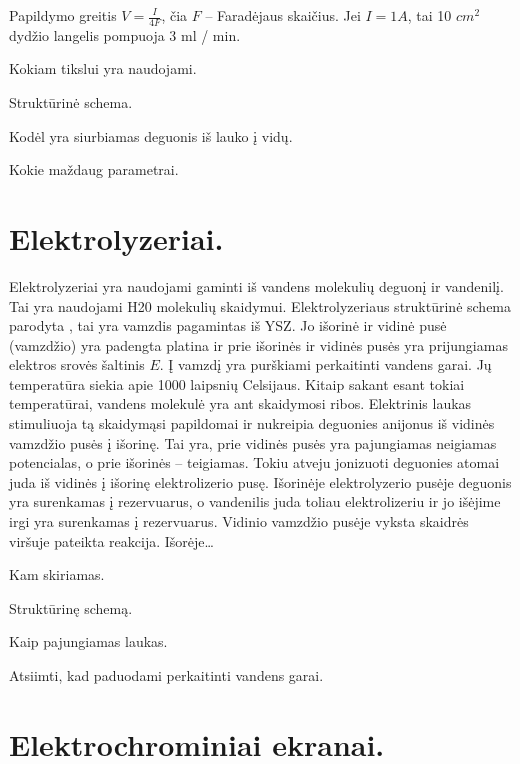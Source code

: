 Papildymo greitis $V = \frac{I}{4F}$, čia $F$ – Faradėjaus skaičius.
Jei $I = 1A$, tai 10 $cm^{2}$  dydžio langelis pompuoja 3 ml / min.
\begin{remember}
  \item Kokiam tikslui yra naudojami.
  \item Struktūrinė schema.
  \item Kodėl yra siurbiamas deguonis iš lauko į vidų.
  \item Kokie maždaug parametrai.
\end{remember}

\section{Elektrolyzeriai.}

Elektrolyzeriai yra naudojami gaminti iš vandens molekulių deguonį
ir vandenilį. Tai yra naudojami H20 molekulių skaidymui. Elektrolyzeriaus
struktūrinė schema parodyta , tai yra vamzdis pagamintas
iš YSZ. Jo išorinė ir vidinė pusė (vamzdžio) yra padengta platina
ir prie išorinės ir vidinės pusės yra prijungiamas elektros srovės
šaltinis $E$. Į vamzdį yra purškiami perkaitinti vandens garai.
Jų temperatūra siekia apie 1000 laipsnių Celsijaus. Kitaip sakant
esant tokiai temperatūrai, vandens molekulė yra ant skaidymosi
ribos. Elektrinis laukas stimuliuoja tą skaidymąsi papildomai ir
nukreipia deguonies anijonus iš vidinės vamzdžio pusės į išorinę.
Tai yra, prie vidinės pusės yra pajungiamas neigiamas potencialas,
o prie išorinės – teigiamas. Tokiu atveju jonizuoti deguonies
atomai juda iš vidinės į išorinę elektrolizerio pusę. Išorinėje
elektrolyzerio pusėje deguonis yra surenkamas į rezervuarus, o 
vandenilis juda toliau elektrolizeriu ir jo išėjime irgi yra
surenkamas į rezervuarus. Vidinio vamzdžio pusėje vyksta skaidrės
viršuje pateikta reakcija. Išorėje…

\begin{remember}
  \item Kam skiriamas.
  \item Struktūrinę schemą.
  \item Kaip pajungiamas laukas.
  \item Atsiimti, kad paduodami perkaitinti vandens garai.
\end{remember}

\section{Elektrochrominiai ekranai.}

